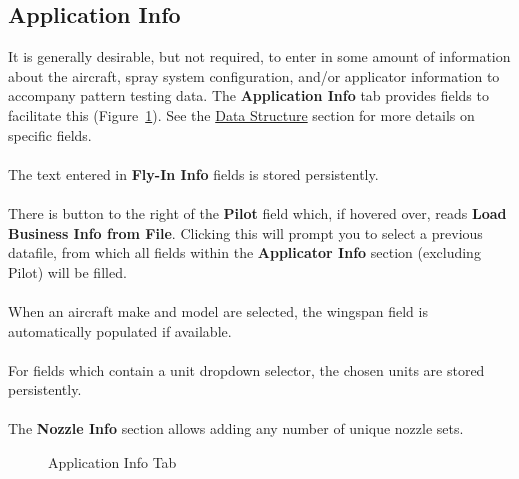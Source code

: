 \documentclass[10pt,letterpaper,titlepage]{article}
\begin{document}
    \subsection{Application Info}
    It is generally desirable, but not required, to enter in some amount of information about the aircraft, spray system configuration, and/or applicator information to accompany pattern testing data. The \textbf{Application Info} tab provides fields to facilitate this (Figure~\ref{fig:application_info}). See the \hyperref[sec:data]{Data Structure} section for more details on specific fields.
    \\\\
    The text entered in \textbf{Fly-In Info} fields is stored persistently.
    \\\\
    There is button to the right of the \textbf{Pilot} field which, if hovered over, reads \textbf{Load Business Info from File}. Clicking this will prompt you to select a previous datafile, from which all fields within the \textbf{Applicator Info} section (excluding Pilot) will be filled.
    \\\\
    When an aircraft make and model are selected, the wingspan field is automatically populated if available.
    \\\\
    For fields which contain a unit dropdown selector, the chosen units are stored persistently.
    \\\\
    The \textbf{Nozzle Info} section allows adding any number of unique nozzle sets. 

    \begin{figure}[hb]
        \centering
        \caption{Application Info Tab}
        \label{fig:application_info}
    \end{figure}
    \FloatBarrier
\end{document}
